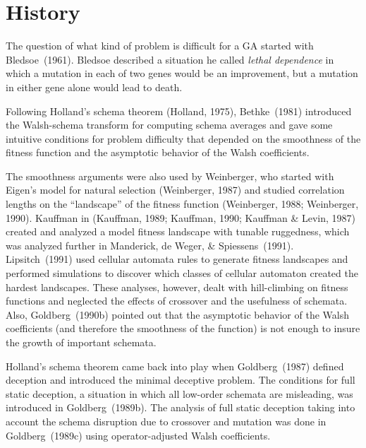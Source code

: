 \typeout{}
\chapter{History}

The question of what kind of problem is difficult for a GA started
with Bledsoe~(1961).  Bledsoe described a situation he called
{\em lethal dependence} in which a mutation in each of two genes would 
be an improvement, but a mutation in either gene alone would lead to
death.  

Following Holland's schema theorem (Holland, 1975), Bethke~(1981)
introduced the Walsh-schema transform for computing schema averages
and gave some intuitive
conditions for problem difficulty that depended on the smoothness of the fitness
function and the asymptotic behavior of the Walsh coefficients.

The smoothness arguments were also used by
Weinberger, who started with Eigen's model for natural selection (Weinberger,
1987) and studied correlation lengths on the ``landscape'' of the fitness
function (Weinberger, 1988; Weinberger, 1990).
Kauffman in (Kauffman, 1989; Kauffman, 1990; Kauffman \& Levin, 1987)
 created and analyzed a model fitness landscape with tunable ruggedness, which
was analyzed further in Manderick, de Weger, \& Spiessens~(1991).
Lipsitch~(1991) used cellular automata rules to generate fitness
landscapes and performed simulations to discover which classes of cellular 
automaton created the hardest landscapes.  These analyses, however,
dealt with hill-climbing on fitness functions and neglected the effects
of crossover and the usefulness of schemata.  Also, Goldberg~(1990b)
pointed out that the asymptotic behavior of the Walsh coefficients
(and therefore the smoothness of the function) is not enough to
insure the growth of important schemata.

Holland's schema theorem came back into play when Goldberg~(1987)
defined deception and introduced the minimal deceptive problem.
The conditions for full static deception, a situation in which
all low-order schemata are misleading, was introduced
in Goldberg~(1989b).  The analysis of full static deception taking
into account the schema disruption due to crossover and mutation was
done in Goldberg~(1989c) using operator-adjusted Walsh coefficients.

